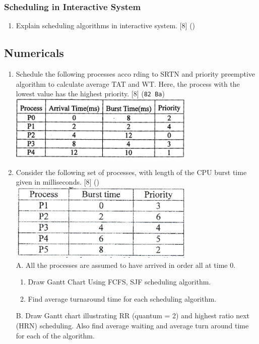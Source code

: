 \documentclass[12pt]{article}
\begin{document}
		\subsubsection{Scheduling in Interactive System}
			\begin{enumerate}[noitemsep, topsep = 0pt]
				\item Explain scheduling algorithms in interactive system. \hfill [8] ()
			\end{enumerate}

	\subsection{Numericals}
		\begin{enumerate}
			\item Schedule the following processes acco	rding to SRTN and priority preemptive algorithm to calculate average TAT and WT. Here, the process with the lowest value has the highest priority. \hfill [8] (\texttt{82 Ba})\\
			\includegraphics[width=3.5in]{./pics/os_26}
		
			\item Consider the following set of processes, with length of the CPU burst time given in milliseconds. \hfill [8] ()\\
			\includegraphics[width=3.5in]{./pics/os_1}\\
			A. All the processes are assumed to have arrived in order all at time 0.
			\begin{enumerate}[noitemsep, topsep = 0pt, label = \alph*.]
				\item Draw Gantt Chart Using FCFS, SJF scheduling algorithm.
				\item Find average turnaround time for each scheduling algorithm.
			\end{enumerate}
			B. Draw Gantt chart illustrating RR (quantum = 2) and highest ratio next (HRN) scheduling. Also find average waiting and average turn around time for each of the algorithm.
			

\end{enumerate}
\end{document}
